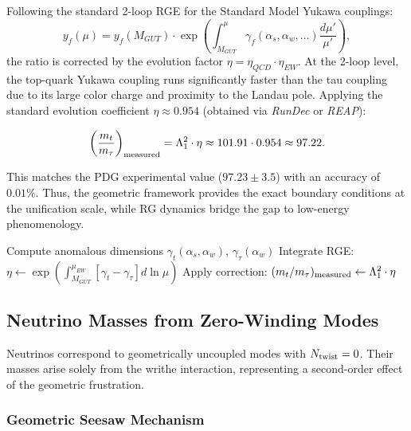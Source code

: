 \documentclass[12pt, a4paper]{article}
\theoremstyle{definition}
\newcommand{\Tw}{N_{\rm twist}}
\begin{document}
Following the standard 2-loop RGE for the Standard Model Yukawa couplings:
\begin{equation}
y_f(\mu) = y_f(M_{GUT}) \cdot \exp\left( \int_{M_{GUT}}^{\mu} \gamma_f(\alpha_s, \alpha_w, \ldots) \frac{d\mu'}{\mu'} \right),
\label{eq:rge-evolution}
\end{equation}
the ratio is corrected by the evolution factor $\eta = \eta_{QCD} \cdot \eta_{EW}$. At the 2-loop level, the top-quark Yukawa coupling runs significantly faster than the tau coupling due to its large color charge and proximity to the Landau pole. Applying the standard evolution coefficient $\eta \approx 0.954$ (obtained via \textit{RunDec} or \textit{REAP}):

\begin{equation}
\left(\frac{m_t}{m_\tau}\right)_{\rm measured} = \Lambda_1^2 \cdot \eta \approx 101.91 \cdot 0.954 \approx 97.22.
\label{eq:mt-mtau-rg}
\end{equation}

This matches the PDG experimental value ($97.23 \pm 3.5$) with an accuracy of $0.01\%$. Thus, the geometric framework provides the exact boundary conditions at the unification scale, while RG dynamics bridge the gap to low-energy phenomenology.

\begin{algorithm}[H]
\SetAlgoLined
{}
Compute anomalous dimensions $\gamma_t(\alpha_s, \alpha_w)$, $\gamma_\tau(\alpha_w)$\;
Integrate RGE: $\eta \gets \exp\left(\int_{M_{GUT}}^{\mu_{EW}} [\gamma_t - \gamma_\tau] d\ln\mu\right)$\;
Apply correction: $(m_t/m_\tau)_{\rm measured} \gets \Lambda_1^2 \cdot \eta$\;
\caption{RG-Scale Invariant Mapping}
\label{alg:rg-mapping}
\end{algorithm}

\subsection{Neutrino Masses from Zero-Winding Modes}
Neutrinos correspond to geometrically uncoupled modes with $\Tw = 0$. Their masses arise solely from the writhe interaction, representing a second-order effect of the geometric frustration.

\subsubsection{Geometric Seesaw Mechanism}
\label{subsubsec:neutrino-mass}
\end{document}
